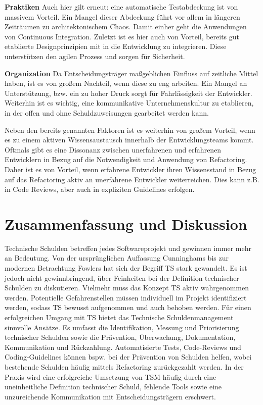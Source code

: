 \documentclass[acmtog]{acmart}
\begin{document}
\textbf{Praktiken}
Auch hier gilt erneut: eine automatische Testabdeckung ist von massivem Vorteil. Ein Mangel dieser Abdeckung führt vor allem in längeren Zeiträumen zu architektonischem Chaos. Damit einher geht die Anwendungen von Continuous Integration.
Zuletzt ist es hier auch von Vorteil, bereits gut etablierte Designprinzipien mit in die Entwicklung zu integrieren. Diese unterstützen den agilen Prozess und sorgen für Sicherheit.

\textbf{Organization}
Da Entscheidungsträger maßgeblichen Einfluss auf zeitliche Mittel haben, ist es von großem Nachteil, wenn diese zu eng arbeiten. Ein Mangel an Unterstützung, bzw. ein zu hoher Druck sorgt für Fahrlässigkeit der Entwickler.
Weiterhin ist es wichtig, eine kommunikative Unternehmenskultur zu etablieren, in der offen und ohne Schuldzuweisungen gearbeitet werden kann.

Neben den bereits genannten Faktoren ist es weiterhin von großem Vorteil, wenn es zu einem aktiven Wissensaustausch innerhalb der Entwicklungsteams kommt. Oftmals gibt es eine Dissonanz zwischen unerfahrenen und erfahrenen Entwicklern in Bezug auf die Notwendigkeit und Anwendung von Refactoring. Daher ist es von Vorteil, wenn erfahrene Entwickler ihren Wissensstand in Bezug auf das Refactoring aktiv an unerfahrene Entwickler weiterreichen. Dies kann z.B. in Code Reviews, aber auch in expliziten Guidelines erfolgen. \cite{6827119, fowler2019refactoring}

\section{Zusammenfassung und Diskussion}\label{sec:Zusammenfassung}

Technische Schulden betreffen jedes Softwareprojekt und gewinnen immer mehr an Bedeutung.
Von der ursprünglichen Auffassung Cunninghams bis zur modernen Betrachtung Fowlers hat
sich der Begriff TS stark gewandelt. Es ist jedoch nicht gewinnbringend, über Feinheiten
bei der Definition technischer Schulden zu diskutieren. Vielmehr muss das Konzept TS aktiv
wahrgenommen werden. Potentielle Gefahrenstellen müssen individuell im Projekt identifiziert
werden, sodass TS bewusst aufgenommen und auch behoben werden. Für einen erfolgreichen Umgang
mit TS bietet das Technische Schuldenmanagement sinnvolle Ansätze. Es umfasst die Identifikation,
Messung und Priorisierung technischer Schulden sowie die Prävention, Überwachung, Dokumentation,
Kommunikation und Rückzahlung. Automatisierte Tests, Code-Reviews und Coding-Guidelines können
bspw. bei der Prävention von Schulden helfen, wobei bestehende Schulden häufig mittels Refactoring
zurückgezahlt werden. In der Praxis wird eine erfolgreiche Umsetzung von TSM häufig durch eine
uneinheitliche Definition technischer Schuld, fehlende Tools sowie eine unzureichende
Kommunikation mit Entscheidungsträgern erschwert.
\end{document}
